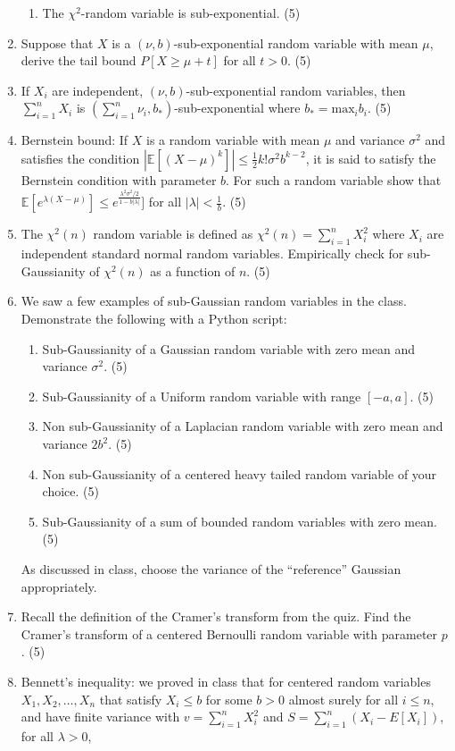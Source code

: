 \documentclass[journal,12pt,twocolumn]{IEEEtran}
\begin{document}
\begin{enumerate}
{\begin{enumerate}
\item{The $\chi^2$-random variable is sub-exponential. (5)}
\end{enumerate}}
\item{Suppose that $X$ is a $(\nu, b)$-sub-exponential random variable with mean $\mu$, derive the tail bound $P[X \geq \mu + t]$ for all $t > 0$. (5)}
\item{If $X_i$ are independent, $(\nu, b)$-sub-exponential random variables, then $\sum\limits_{i=1}^n X_i$ is $(\sum\limits_{i=1}^n \nu_i, b_*)$-sub-exponential where $b_* = \text{max}_i b_i$. (5)}
\item{Bernstein bound: If $X$ is a random variable with mean $\mu$ and variance $\sigma^2$ and satisfies the condition $|\mathbb{E}[(X - \mu)^k]| \leq \frac{1}{2}k!\sigma^2b^{k-2}$, it is said to satisfy the Bernstein condition with parameter $b$. For such a random variable show that $\mathbb{E}[e^{\lambda(X - \mu)}]\leq e^{\frac{\lambda^2\sigma^2/2}{1 - b|\lambda|}}]$ for all $|\lambda| < \frac{1}{b}$. (5)}
\item{The $\chi^2(n)$ random variable is defined as $\chi^2(n) = \sum\limits_{i=1}^{n}X_i^2$ where $X_i$ are independent standard normal random variables. Empirically check for sub-Gaussianity of $\chi^2(n)$ as a function of $n$. (5)}
\item{We saw a few examples of sub-Gaussian random variables in the class. Demonstrate the following with a Python script:
\begin{enumerate}
\item{Sub-Gaussianity of a Gaussian random variable with zero mean and variance $\sigma^2$. (5)}
\item{Sub-Gaussianity of a Uniform random variable with range $[-a, a]$. (5)}
\item{Non sub-Gaussianity of a Laplacian random variable with zero mean and variance $2b^2$. (5)}
\item{Non sub-Gaussianity of a centered heavy tailed random variable of your choice. (5)}
\item{Sub-Gaussianity of a sum of bounded random variables with zero mean. (5)}
\end{enumerate}
As discussed in class, choose the variance of the ``reference'' Gaussian appropriately. 
}
\item{Recall the definition of the Cramer's transform from the quiz. Find the Cramer's transform of a centered Bernoulli random variable with parameter $p$. (5)}
\item{Bennett's inequality: we proved in class that for centered random variables $X_1, X_2, \ldots, X_n$ that satisfy $X_i \leq b$ for some $b > 0$ almost surely for all $i \leq n$, and have finite variance with $v = \sum\limits_{i=1}^nX_i^2$ and $S = \sum\limits_{i=1}^n (X_i - E[X_i])$, for all $\lambda > 0$, 
}
\end{enumerate}
\end{document}
